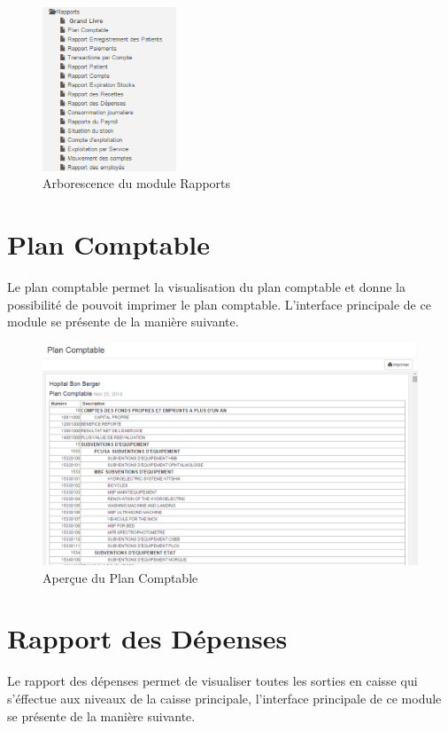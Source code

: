 \documentclass[12pt,a4paper]{report}
\begin{document}
\begin{figure}[h]
\begin{center}
\includegraphics[width=4cm]{pic/ArboReport.png}
\end{center}
\caption{Arborescence du module Rapports}
\label{Arborescence du module Rapports}
\end{figure}

\newpage
\section{Plan Comptable}
Le plan comptable permet la visualisation du plan comptable et donne la possibilité de pouvoit imprimer le plan comptable. L'interface principale de ce module se présente de la manière suivante. 

\begin{figure}[h]
\begin{center}
\includegraphics[width=14cm]{pic/PlanComptableAf.png}
\end{center}
\caption{Aperçue du Plan Comptable}
\label{Aperçue du Plan Comptable}
\end{figure}


\newpage
\section{Rapport des Dépenses}
Le rapport des dépenses permet de visualiser toutes les sorties en caisse qui s'éffectue aux niveaux de la caisse principale, l'interface principale de ce module se présente de la manière suivante.
\end{document}
